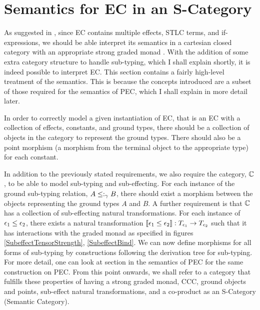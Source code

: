 \documentclass{Report}
\begin{document}
\chapter{Semantics for EC in an S-Category}

As suggested in , since EC contains multiple effects, STLC terms, and if-expressions, we should be able interpret its semantics in a cartesian closed category with an appropriate strong graded monad . With the addition of some extra category structure to handle sub-typing, which I shall explain shortly, it is indeed possible to interpret EC. This section contains a fairly high-level treatment of the semantics. This is because the concepts introduced are a subset of those required for the semantics of PEC, which I shall explain in more detail later.


In order to correctly model a given instantiation of EC, that is an EC with a collection of effects, constants, and ground types, there should be a collection of objects in the category to represent the ground types. There should also be a point morphism (a morphism from the terminal object to the appropriate type) for each constant.

In addition to the previously stated requirements, we also require the category, $\mathbb{C}$, to be able to model sub-typing and sub-effecting. For each instance of the ground sub-typing relation, $A \leq:_\gamma B$, there should exist a morphism between the objects representing the ground types $A$ and $B$. A further requirement is that $\mathbb{C}$ has a collection of sub-effecting natural transformations. For each instance of $\epsilon_1 \leq \epsilon_2$, there exists a natural transformation ${\bf [\![}\epsilon_1\leq\epsilon_2{\bf ]\!]}: T_{\epsilon_1}{}\rightarrow T_{\epsilon_2}{}$ such that it has interactions with the graded monad as specified in figures \ref{SubeffectTensorStrength}, \ref{SubeffectBind}. We can now define morphisms for all forms of sub-typing by constructions following the derivation tree for sub-typing. For more detail, one can look at section  in the semantics of PEC for the same construction on PEC. From this point onwards, we shall refer to a category that fulfills these properties of having a strong graded monad, CCC, ground objects and points, sub-effect natural transformations, and a co-product as an S-Category (Semantic Category).
\end{document}
